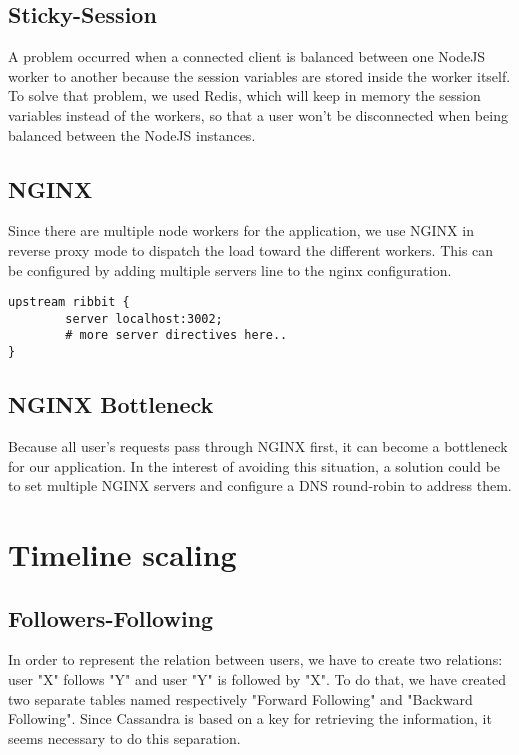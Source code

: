 \documentclass[conference,9pt]{IEEEtran}
\begin{document}
\subsection{Sticky-Session}
A problem occurred when a connected client is balanced between one NodeJS worker to another because the session variables are stored inside the worker itself. To solve that problem, we used Redis, which will keep in memory the session variables instead of the workers, so that a user won't be disconnected when being balanced between the NodeJS instances.

\subsection{NGINX}
Since there are multiple node workers for the application, we use NGINX in reverse proxy mode to dispatch the load toward the different workers.  This can be configured by adding multiple servers line to the nginx configuration.

\begin{lstlisting}
upstream ribbit {
        server localhost:3002;
        # more server directives here..
}
\end{lstlisting}

\subsection{NGINX Bottleneck}
Because all user's requests pass through NGINX first, it can become a bottleneck for our application. In the interest of avoiding this situation, a solution could be to set multiple NGINX servers and configure a DNS round-robin to address them. 
\section{Timeline scaling}
%
\subsection{Followers-Following}
In order to represent the relation between users, we have to create two relations: user "X" follows "Y" and user "Y" is followed by "X". To do that, we have created two separate tables named respectively "Forward Following"  and "Backward Following". Since Cassandra is based on a key for retrieving the information, it seems necessary to do this separation.
\end{document}
